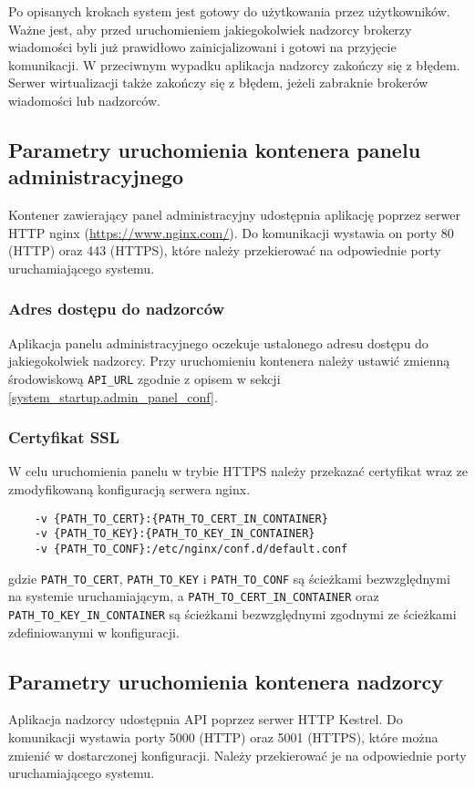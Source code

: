 \documentclass[../opis-rozwiazania.tex]{subfiles}
\begin{document}
Po opisanych krokach system jest gotowy do użytkowania przez użytkowników.
Ważne jest, aby przed uruchomieniem jakiegokolwiek nadzorcy brokerzy wiadomości byli już prawidłowo zainicjalizowani i gotowi na przyjęcie komunikacji.
W przeciwnym wypadku aplikacja nadzorcy zakończy się z błędem.
Serwer wirtualizacji także zakończy się z błędem, jeżeli zabraknie brokerów wiadomości lub nadzorców.

\subsection{Parametry uruchomienia kontenera panelu administracyjnego}
Kontener zawierający panel administracyjny udostępnia aplikację poprzez serwer HTTP nginx (\url{https://www.nginx.com/}).
Do komunikacji wystawia on porty 80 (HTTP) oraz 443 (HTTPS), które należy przekierować na odpowiednie porty uruchamiającego systemu.

\subsubsection{Adres dostępu do nadzorców}
Aplikacja panelu administracyjnego oczekuje ustalonego adresu dostępu do jakiegokolwiek nadzorcy.
Przy uruchomieniu kontenera należy ustawić zmienną środowiskową \texttt{API\_URL} zgodnie z opisem w sekcji \ref{system_startup.admin_panel_conf}.

\subsubsection{Certyfikat SSL}
W celu uruchomienia panelu w trybie HTTPS należy przekazać certyfikat wraz ze zmodyfikowaną konfiguracją serwera nginx.
\begin{verbatim}
	-v {PATH_TO_CERT}:{PATH_TO_CERT_IN_CONTAINER}
	-v {PATH_TO_KEY}:{PATH_TO_KEY_IN_CONTAINER}
	-v {PATH_TO_CONF}:/etc/nginx/conf.d/default.conf
\end{verbatim}
gdzie \texttt{PATH\_TO\_CERT}, \texttt{PATH\_TO\_KEY} i \texttt{PATH\_TO\_CONF} są ścieżkami bezwzględnymi na systemie uruchamiającym, a \texttt{PATH\_TO\_CERT\_IN\_CONTAINER} oraz \texttt{PATH\_TO\_KEY\_IN\_CONTAINER} są ścieżkami bezwzględnymi zgodnymi ze ścieżkami zdefiniowanymi w konfiguracji.

\subsection{Parametry uruchomienia kontenera nadzorcy}
Aplikacja nadzorcy udostępnia API poprzez serwer HTTP Kestrel.
Do komunikacji wystawia porty 5000 (HTTP) oraz 5001 (HTTPS), które można zmienić w dostarczonej konfiguracji.
Należy przekierować je na odpowiednie porty uruchamiającego systemu.
\end{document}
